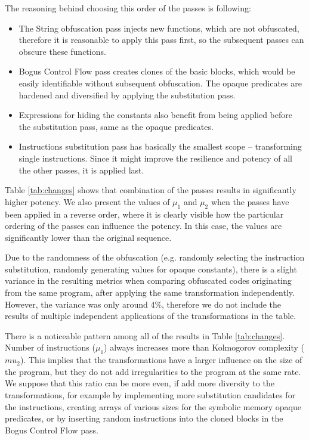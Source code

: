 \documentclass[
  digital, %
  notable,   %
  twoside, %
  nolof,     %
  nolot,     %
]{fithesis3}
\theoremstyle{definition}
\begin{document}
The reasoning behind choosing this order of the passes is following: 

\begin{itemize}
    \item The String obfuscation pass injects new functions, which are not obfuscated, therefore it is reasonable to apply this pass first, so the subsequent passes can obscure these functions.
    \item Bogus Control Flow pass creates clones of the basic blocks, which would be easily identifiable without subsequent obfuscation. The opaque predicates are hardened and diversified by applying the substitution pass. 
    \item Expressions for hiding the constants also benefit from being applied before the substitution pass, same as the opaque predicates.
    \item Instructions substitution pass has basically the smallest scope -- transforming single instructions. Since it might improve the resilience and potency of all the other passes, it is applied last.
\end{itemize}

Table \ref{tab:changes} shows that combination of the passes results in significantly higher potency. We also present the values of $\mu_1$ and $\mu_2$ when the passes have been applied in a reverse order, where it is clearly visible how the particular ordering of the passes can influence the potency. In this case, the values are significantly lower than the original sequence. 

Due to the randomness of the obfuscation (e.g. randomly selecting the instruction substitution, randomly generating values for opaque constants), there is a slight variance in the resulting metrics when comparing obfuscated codes originating from the same program, after applying the same transformation independently. However, the variance was only around 4\%, therefore we do not include the results of multiple independent applications of the transformations in the table.

There is a noticeable pattern among all of the results in Table \ref{tab:changes}. Number of instructions ($\mu_1$) always increases more than Kolmogorov complexity ($mu_2$). This implies that the transformations have a larger influence on the size of the program, but they do not add irregularities to the program at the same rate. We suppose that this ratio can be more even, if add more diversity to the transformations, for example by implementing more substitution candidates for the instructions, creating arrays of various sizes for the symbolic memory opaque predicates, or by inserting random instructions into the cloned blocks in the Bogus Control Flow pass.
\end{document}
